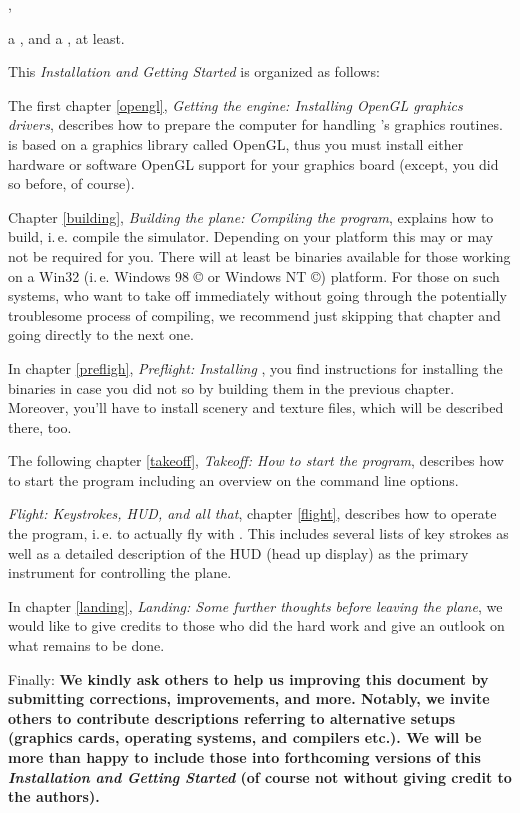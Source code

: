 ,

 \noindent
a \textit{}, and a
\textit{}, at least.

This \textit{Installation and Getting Started} is organized as
follows:

The first chapter \ref{opengl}, \textit{Getting the engine: Installing OpenGL graphics
drivers}, describes how to prepare the computer for handling \FlightGear's graphics
routines. \FlightGear is based on a graphics library called OpenGL, thus you must install
either hardware or software OpenGL support for your graphics board (except, you did so
before, of course).

Chapter \ref{building}, \textit{Building the plane: Compiling the program}, explains how
to build, i.\,e. compile the simulator. Depending on your platform this may or may not be
required for you. There will at least be binaries available for those working on a Win32
(i.\,e. Windows 98 {\copyright} or Windows NT {\copyright}) platform. For those on such
systems, who want to take off immediately without going through the potentially
troublesome process of compiling, we recommend just skipping that chapter and going
directly to the next one.

In chapter \ref{prefligh}, \textit{Preflight: Installing \FlightGear}, you find
instructions for installing the binaries in case you did not so by building them in the
previous chapter. Moreover, you'll have to install scenery and texture files, which will
be described there, too.

The following chapter \ref{takeoff}, \textit{Takeoff: How to start the program},
describes how to start the program including an overview on the command line options.

\textit{Flight: Keystrokes, HUD, and all that}, chapter \ref{flight}, describes how to
operate the program, i.\,e. to actually fly with \FlightGear. This includes several lists
of key strokes as well as a detailed description of the HUD (head up display) as the
primary instrument for controlling the plane.

In chapter \ref{landing}, \textit{Landing: Some further thoughts before leaving the
plane}, we would like to give credits to those who did the hard work and give an outlook
on what remains to be done.

Finally: \textbf{We kindly ask others to help us improving this document by submitting
corrections, improvements, and more. Notably, we invite others to contribute descriptions
referring to alternative setups (graphics cards, operating systems, and compilers etc.).
We will be more than happy to include those into forthcoming versions of this
\textit{Installation and Getting Started} (of course not without giving credit to the
authors).}

